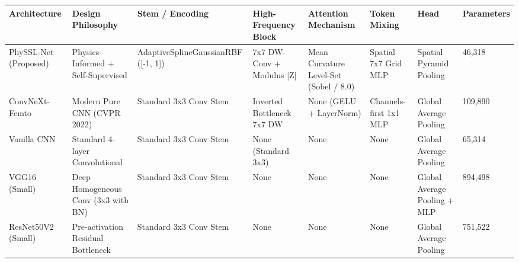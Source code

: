 \begin{tabular}{llllllll}
\toprule
Architecture & Design Philosophy & Stem / Encoding & High-Frequency Block & Attention Mechanism & Token Mixing & Head & Parameters \\
\midrule
PhySSL-Net (Proposed) & Physics-Informed + Self-Supervised & AdaptiveSplineGaussianRBF ([-1, 1]) & 7x7 DW-Conv + Modulus |Z| & Mean Curvature Level-Set (Sobel / 8.0) & Spatial 7x7 Grid MLP & Spatial Pyramid Pooling & 46,318 \\
ConvNeXt-Femto & Modern Pure CNN (CVPR 2022) & Standard 3x3 Conv Stem & Inverted Bottleneck 7x7 DW & None (GELU + LayerNorm) & Channels-first 1x1 MLP & Global Average Pooling & 109,890 \\
Vanilla CNN & Standard 4-layer Convolutional & Standard 3x3 Conv Stem & None (Standard 3x3) & None & None & Global Average Pooling & 65,314 \\
VGG16 (Small) & Deep Homogeneous Conv (3x3 with BN) & Standard 3x3 Conv Stem & None & None & None & Global Average Pooling + MLP & 894,498 \\
ResNet50V2 (Small) & Pre-activation Residual Bottleneck & Standard 3x3 Conv Stem & None & None & None & Global Average Pooling & 751,522 \\
\bottomrule
\end{tabular}
